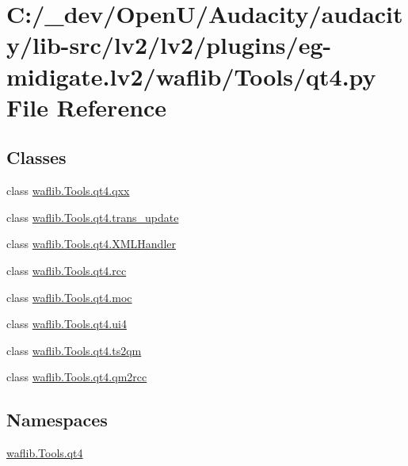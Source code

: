 \hypertarget{lv2_2plugins_2eg-midigate_8lv2_2waflib_2_tools_2qt4_8py}{}\section{C\+:/\+\_\+dev/\+Open\+U/\+Audacity/audacity/lib-\/src/lv2/lv2/plugins/eg-\/midigate.lv2/waflib/\+Tools/qt4.py File Reference}
\label{lv2_2plugins_2eg-midigate_8lv2_2waflib_2_tools_2qt4_8py}
\subsection*{Classes}
\begin{DoxyCompactItemize}
\item 
class \hyperlink{classwaflib_1_1_tools_1_1qt4_1_1qxx}{waflib.\+Tools.\+qt4.\+qxx}
\item 
class \hyperlink{classwaflib_1_1_tools_1_1qt4_1_1trans__update}{waflib.\+Tools.\+qt4.\+trans\+\_\+update}
\item 
class \hyperlink{classwaflib_1_1_tools_1_1qt4_1_1_x_m_l_handler}{waflib.\+Tools.\+qt4.\+X\+M\+L\+Handler}
\item 
class \hyperlink{classwaflib_1_1_tools_1_1qt4_1_1rcc}{waflib.\+Tools.\+qt4.\+rcc}
\item 
class \hyperlink{classwaflib_1_1_tools_1_1qt4_1_1moc}{waflib.\+Tools.\+qt4.\+moc}
\item 
class \hyperlink{classwaflib_1_1_tools_1_1qt4_1_1ui4}{waflib.\+Tools.\+qt4.\+ui4}
\item 
class \hyperlink{classwaflib_1_1_tools_1_1qt4_1_1ts2qm}{waflib.\+Tools.\+qt4.\+ts2qm}
\item 
class \hyperlink{classwaflib_1_1_tools_1_1qt4_1_1qm2rcc}{waflib.\+Tools.\+qt4.\+qm2rcc}
\end{DoxyCompactItemize}
\subsection*{Namespaces}
\begin{DoxyCompactItemize}
\item 
 \hyperlink{namespacewaflib_1_1_tools_1_1qt4}{waflib.\+Tools.\+qt4}
\end{DoxyCompactItemize}
